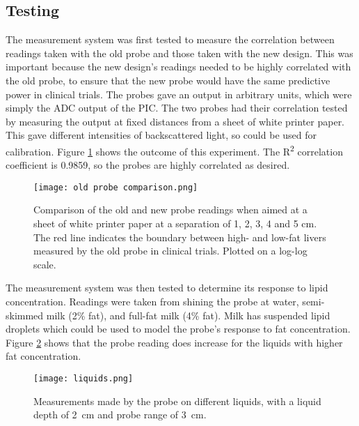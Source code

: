 \subsection{Testing}
The measurement system was first tested to measure the correlation between readings taken with the old probe and those taken with the new design. This was important because the new design's readings needed to be highly correlated with the old probe, to ensure that the new probe would have the same predictive power in clinical trials. The probes gave an output in arbitrary units, which were simply the ADC output of the PIC. The two probes had their correlation tested by measuring the output at fixed distances from a sheet of white printer paper. This gave different intensities of backscattered light, so could be used for calibration. Figure \ref{fig: old probe comparison} shows the outcome of this experiment. The R\textsuperscript{2} correlation coefficient is 0.9859, so the probes are highly correlated as desired. \\

\begin{figure}[ht]
	\centering
	\texttt{[image: old probe comparison.png]}
	\caption{Comparison of the old and new probe readings when aimed at a sheet of white printer paper at a separation of 1, 2, 3, 4 and 5 cm. The red line indicates the boundary between high- and low-fat livers measured by the old probe in clinical trials. Plotted on a log-log scale.}
	\label{fig: old probe comparison}
\end{figure}

The measurement system was then tested to determine its response to lipid concentration. Readings were taken from shining the probe at water, semi-skimmed milk (2\% fat), and full-fat milk (4\% fat). Milk has suspended lipid droplets which could be used to model the probe's response to fat concentration. Figure \ref{fig: liquids} shows that the probe reading does increase for the liquids with higher fat concentration.

\begin{figure}[ht]
	\centering
	\texttt{[image: liquids.png]}
	\caption{Measurements made by the probe on different liquids, with a liquid depth of \SI{2}{\centi\metre} and probe range of \SI{3}{\centi\metre}.}
	\label{fig: liquids}
	\vspace{-8mm}
\end{figure}






